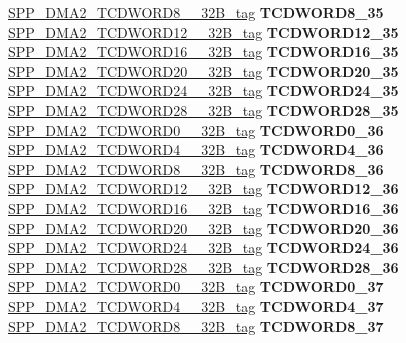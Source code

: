 \begin{DoxyCompactItemize}
\begin{tabbing}
\>\>\mbox{\hyperlink{unionSPP__DMA2__TCDWORD8____32B__tag}{SPP\_DMA2\_TCDWORD8\_\_32B\_tag}} {\bfseries TCDWORD8\_35}\\
\>\>\mbox{\hyperlink{unionSPP__DMA2__TCDWORD12____32B__tag}{SPP\_DMA2\_TCDWORD12\_\_32B\_tag}} {\bfseries TCDWORD12\_35}\\
\>\>\mbox{\hyperlink{unionSPP__DMA2__TCDWORD16____32B__tag}{SPP\_DMA2\_TCDWORD16\_\_32B\_tag}} {\bfseries TCDWORD16\_35}\\
\>\>\mbox{\hyperlink{unionSPP__DMA2__TCDWORD20____32B__tag}{SPP\_DMA2\_TCDWORD20\_\_32B\_tag}} {\bfseries TCDWORD20\_35}\\
\>\>\mbox{\hyperlink{unionSPP__DMA2__TCDWORD24____32B__tag}{SPP\_DMA2\_TCDWORD24\_\_32B\_tag}} {\bfseries TCDWORD24\_35}\\
\>\>\mbox{\hyperlink{unionSPP__DMA2__TCDWORD28____32B__tag}{SPP\_DMA2\_TCDWORD28\_\_32B\_tag}} {\bfseries TCDWORD28\_35}\\
\>\>\mbox{\hyperlink{unionSPP__DMA2__TCDWORD0____32B__tag}{SPP\_DMA2\_TCDWORD0\_\_32B\_tag}} {\bfseries TCDWORD0\_36}\\
\>\>\mbox{\hyperlink{unionSPP__DMA2__TCDWORD4____32B__tag}{SPP\_DMA2\_TCDWORD4\_\_32B\_tag}} {\bfseries TCDWORD4\_36}\\
\>\>\mbox{\hyperlink{unionSPP__DMA2__TCDWORD8____32B__tag}{SPP\_DMA2\_TCDWORD8\_\_32B\_tag}} {\bfseries TCDWORD8\_36}\\
\>\>\mbox{\hyperlink{unionSPP__DMA2__TCDWORD12____32B__tag}{SPP\_DMA2\_TCDWORD12\_\_32B\_tag}} {\bfseries TCDWORD12\_36}\\
\>\>\mbox{\hyperlink{unionSPP__DMA2__TCDWORD16____32B__tag}{SPP\_DMA2\_TCDWORD16\_\_32B\_tag}} {\bfseries TCDWORD16\_36}\\
\>\>\mbox{\hyperlink{unionSPP__DMA2__TCDWORD20____32B__tag}{SPP\_DMA2\_TCDWORD20\_\_32B\_tag}} {\bfseries TCDWORD20\_36}\\
\>\>\mbox{\hyperlink{unionSPP__DMA2__TCDWORD24____32B__tag}{SPP\_DMA2\_TCDWORD24\_\_32B\_tag}} {\bfseries TCDWORD24\_36}\\
\>\>\mbox{\hyperlink{unionSPP__DMA2__TCDWORD28____32B__tag}{SPP\_DMA2\_TCDWORD28\_\_32B\_tag}} {\bfseries TCDWORD28\_36}\\
\>\>\mbox{\hyperlink{unionSPP__DMA2__TCDWORD0____32B__tag}{SPP\_DMA2\_TCDWORD0\_\_32B\_tag}} {\bfseries TCDWORD0\_37}\\
\>\>\mbox{\hyperlink{unionSPP__DMA2__TCDWORD4____32B__tag}{SPP\_DMA2\_TCDWORD4\_\_32B\_tag}} {\bfseries TCDWORD4\_37}\\
\>\>\mbox{\hyperlink{unionSPP__DMA2__TCDWORD8____32B__tag}{SPP\_DMA2\_TCDWORD8\_\_32B\_tag}} {\bfseries TCDWORD8\_37}\\

\end{tabbing}
\end{DoxyCompactItemize}
